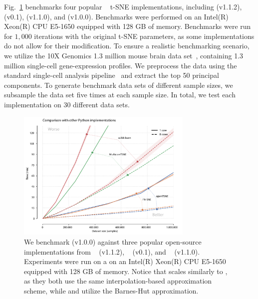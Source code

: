 \documentclass[article]{jss}
\newcommand{\opentsne}{\pkg{openTSNE}\xspace}
\begin{document}
Fig.~\ref{fig:benchmarks_py} benchmarks four popular ~\citep{vanrossum1995python} t-SNE implementations, including  (v1.1.2),  (v0.1),  (v1.1.0), and \opentsne (v1.0.0). Benchmarks were performed on an Intel(R) Xeon(R) CPU E5-1650 equipped with 128 GB of memory. Benchmarks were run for $1,000$ iterations with the original t-SNE parameters, as some implementations do not allow for their modification. To ensure a realistic benchmarking scenario, we utilize the 10X Genomics 1.3 million mouse brain data set~\citep{cao2019single}, containing 1.3 million single-cell gene-expression profiles. We preprocess the data using the standard single-cell analysis pipeline~\citep{kiselev2019challenges} and extract the top 50 principal components. To generate benchmark data sets of different sample sizes, we subsample the data set five times at each sample size. In total, we test each implementation on 30 different data sets.

\begin{figure}[ht]
  \centering
  \includegraphics[width=0.75\textwidth]{benchmarks_python-final}
  \caption{\label{fig:benchmarks_py}
  We benchmark \opentsne (v1.0.0) against three popular open-source
  implementations from ~\citep{pedregosa2011scikit}
  (v1.1.2), ~\citep{Ulyanov2016} (v0.1), and
  ~\citep{linderman2019fast} (v1.1.0). Experiments were run on a
  on an Intel(R) Xeon(R) CPU E5-1650 equipped with 128 GB of memory. Notice
  that \opentsne scales similarly to , as they both use the
  same interpolation-based approximation scheme, while  and
   utilize the Barnes-Hut approximation.
}
\end{figure}
\end{document}
